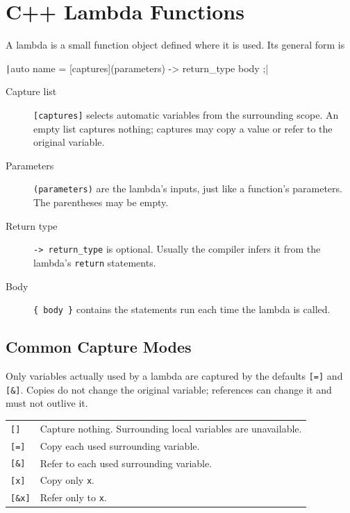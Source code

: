 \codebooklayoutbreak
\section{C++ Lambda Functions}

A lambda is a small function object defined where it is used. Its general form is

\texttt|auto name = [captures](parameters) -> return_type { body };|

\begin{description}
  \item[Capture list] \texttt{[captures]} selects automatic variables from the
    surrounding scope. An empty list captures nothing; captures may copy a value or
    refer to the original variable.
  \item[Parameters] \texttt{(parameters)} are the lambda's inputs, just like a
    function's parameters. The parentheses may be empty.
  \item[Return type] \texttt{-> return\_type} is optional. Usually the compiler
    infers it from the lambda's \texttt{return} statements.
  \item[Body] \texttt{\{ body \}} contains the statements run each time the lambda
    is called.
\end{description}

\subsection{Common Capture Modes}

Only variables actually used by a lambda are captured by the defaults
\texttt{[=]} and \texttt{[\&]}. Copies do not change the original variable;
references can change it and must not outlive it.

\begin{tabularx}{\textwidth}{@{}lX@{}}
  \texttt{[]} & Capture nothing. Surrounding local variables are unavailable. \\
  \texttt{[=]} & Copy each used surrounding variable. \\
  \texttt{[\&]} & Refer to each used surrounding variable. \\
  \texttt{[x]} & Copy only \texttt{x}. \\
  \texttt{[\&x]} & Refer only to \texttt{x}. \\
\end{tabularx}


